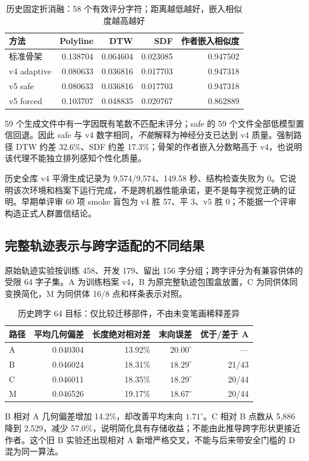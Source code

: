 \documentclass[UTF8,a4paper,11pt,fontset=fandol]{ctexart}
\begin{document}
\begin{table}[H]\centering\small
\caption{历史固定折消融：58 个有效评分字符；距离越低越好，嵌入相似度越高越好}
\begin{tabular}{lrrrr}\toprule
方法 & Polyline & DTW & SDF & 作者嵌入相似度\\\midrule
标准骨架 & 0.138704 & 0.064604 & 0.023085 & 0.947502\\
v4 adaptive & 0.080633 & 0.036816 & 0.017703 & 0.947318\\
v5 safe & 0.080633 & 0.036816 & 0.017703 & 0.947318\\
v5 forced & 0.103707 & 0.048835 & 0.020767 & 0.862889\\\bottomrule
\end{tabular}
\end{table}
59 个生成文件中有一字因既有笔数不匹配未评分；safe 的 59 个文件全部低模型置信回退。因此 safe 与 v4 数字相同，\emph{不能}解释为神经分支已达到 v4 质量。强制路径 DTW 约差 32.6\%、SDF 约差 17.3\%；骨架的作者嵌入分数略高于 v4，也说明该代理不能独立排列感知个性化质量。

历史全库 v4 平滑生成记录为 9,574/9,574、149.58 秒、结构检查失败为 0。它说明该次环境和档案下运行完成，不是跨机器性能承诺，更不是每字视觉正确的证明。早期单评审 60 项 smoke 盲包为 v4 胜 57、平 3、v5 胜 0；不能据一个评审构造正式人群置信结论。

\subsection{完整轨迹表示与跨字适配的不同结果}
原始轨迹实验按训练 458、开发 179、留出 156 字分组；跨字评分为有兼容供体的受限 64 字子集。A 为训练档案 v4，B 为原完整轨迹包围盒放置，C 为同供体同变换简化，M 为同供体 16/8 点和样条表示对照\cite{raw-note}。

\begin{table}[H]\centering\small
\caption{历史跨字 64 目标：仅比较迁移部件，不由未变笔画稀释差异}
\begin{tabular}{lrrrr}\toprule
路径 & 平均几何偏差 & 长度绝对相对差 & 末向误差 & 优于/差于 A\\\midrule
A & 0.040304 & 13.92\% & $20.00^\circ$ & ---\\
B & 0.046024 & 18.31\% & $18.29^\circ$ & 21/43\\
C & 0.046011 & 18.35\% & $18.29^\circ$ & 20/44\\
M & 0.046526 & 19.17\% & $18.67^\circ$ & 20/44\\\bottomrule
\end{tabular}
\end{table}
B 相对 A 几何偏差增加 14.2\%，却改善平均末向 $1.71^\circ$。C 相对 B 点数从 5,886 降到 2,529，减少 57.0\%，说明简化具有存储收益；不能由此推导跨字形状更接近作者。这个旧 B 实验还出现相对 A 新增严格交叉，不能与后来带安全门槛的 D 混为同一算法。
\end{document}
